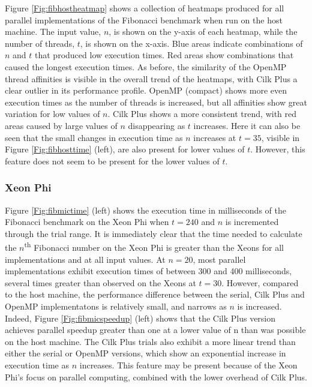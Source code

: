 \documentclass{report}
\begin{document}
Figure \ref{Fig:fibhostheatmap} shows a collection of heatmaps produced for all parallel implementations of the Fibonacci benchmark when run on the host machine. The input value, \(n\), is shown on the y-axis of each heatmap, while the number of threads, \(t\), is shown on the x-axis. Blue areas indicate combinations of \(n\) and \(t\) that produced low execution times. Red areas show combinations that caused the longest execution times. As before, the similarity of the OpenMP thread affinities is visible in the overall trend of the heatmaps, with Cilk Plus a clear outlier in its performance profile. OpenMP (compact) shows more even execution times as the number of threads is increased, but all affinities show great variation for low values of \(n\). Cilk Plus shows a more consistent trend, with red areas caused by large values of \(n\) disappearing as \(t\) increases. Here it can also be seen that the small changes in execution time as \(n\) increases at \(t=35\), visible in Figure \ref{Fig:fibhosttime} (left), are also present for lower values of \(t\). However, this feature does not seem to be present for the lower values of \(t\).

\subsubsection{Xeon Phi}

Figure \ref{Fig:fibmictime} (left) shows the execution time in milliseconds of the Fibonacci benchmark on the Xeon Phi when \(t=240\) and \(n\) is incremented through the trial range. It is immediately clear that the time needed to calculate the \(n\)\textsuperscript{th} Fibonacci number on the Xeon Phi is greater than the Xeons for all implementations and at all input values. At \(n=20\), most parallel implementations exhibit execution times of between 300 and 400 milliseconds, several times greater than observed on the Xeons at \(t=30\). However, compared to the host machine, the performance difference between the serial, Cilk Plus and OpenMP implementatons is relatively small, and narrows as \(n\) is increased. Indeed, Figure \ref{Fig:fibmicspeedup} (left) shows that the Cilk Plus version achieves parallel speedup greater than one at a lower value of n than was possible on the host machine. The Cilk Plus trials also exhibit a more linear trend than either the serial or OpenMP versions, which show an exponential increase in execution time as \(n\) increases. This feature may be present because of the Xeon Phi's focus on parallel computing, combined with the lower overhead of Cilk Plus.
\end{document}
